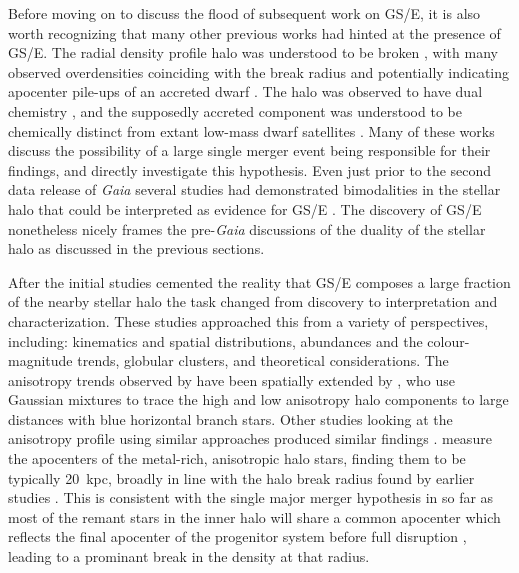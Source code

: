 Before moving on to discuss the flood of subsequent work on GS/E, it is also worth recognizing that many other previous works had hinted at the presence of GS/E. The radial density profile halo was understood to be broken \parencite{deason11,sesar11}, with many observed overdensities coinciding with the break radius and potentially indicating apocenter pile-ups of an accreted dwarf \parencite{li16}. The halo was observed to have dual chemistry \parencite{carollo07,nissen10}, and the supposedly accreted component was understood to be chemically distinct from extant low-mass dwarf satellites \parencite{venn04}. Many of these works discuss the possibility of a large single merger event being responsible for their findings, and \textcite{deason13} directly investigate this hypothesis. Even just prior to the second data release of \textit{Gaia} several studies had demonstrated bimodalities in the stellar halo that could be interpreted as evidence for GS/E \parencite{bonaca17,deason17,hayes18}. The discovery of GS/E nonetheless nicely frames the pre-\textit{Gaia} discussions of the duality of the stellar halo as discussed in the previous sections.

After the initial studies cemented the reality that GS/E composes a large fraction of the nearby stellar halo the task changed from discovery to interpretation and characterization. These studies approached this from a variety of perspectives, including: kinematics and spatial distributions, abundances and the colour-magnitude trends, globular clusters, and theoretical considerations. The anisotropy trends observed by \textcite{belokurov18} have been spatially extended by \textcite{lancaster19}, who use Gaussian mixtures to trace the high and low anisotropy halo components to large distances with blue horizontal branch stars. Other studies looking at the anisotropy profile using similar approaches produced similar findings \parencite{necib19,bird19}. \textcite{deason18} measure the apocenters of the metal-rich, anisotropic halo stars, finding them to be typically 20~kpc, broadly in line with the halo break radius found by earlier studies \parencite[e.g.][]{deason11,sesar11,xue15}. This is consistent with the single major merger hypothesis in so far as most of the remant stars in the inner halo will share a common apocenter which reflects the final apocenter of the progenitor system before full disruption \parencite[indeed, this was the driver for the hypothesis of][]{deason13}, leading to a prominant break in the density at that radius. 

